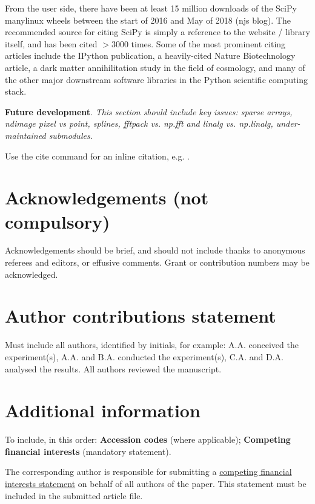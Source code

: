 \documentclass[fleqn,10pt]{wlscirep}
\begin{document}
From the user side, there have been at least 15 million downloads
of the SciPy manylinux wheels between the start of 2016 and May of 2018
(njs blog). The recommended source for citing SciPy is simply a reference
to the website / library itself\cite{SciPylib}, and has been cited $>3000$
times. Some of the most prominent citing articles include the IPython
publication\cite{PER-GRA:2007}, a heavily-cited Nature Biotechnology
article\cite{pmid17287757}, a dark
matter annihilitation study in the field of
cosmology\cite{1475-7516-2012-08-007}, and many of the
other major downstream software libraries in the Python scientific
computing stack.

\textbf{Future development}.
\textit{This section should include key issues: sparse arrays, ndimage pixel vs point, splines, fftpack vs. np.fft and linalg vs. np.linalg, under-maintained submodules.}




\noindent Use the cite command for an inline citation, e.g. \cite{behnel2011cython}.

\section*{Acknowledgements (not compulsory)}

Acknowledgements should be brief, and should not include thanks to anonymous referees and editors, or effusive comments. Grant or contribution numbers may be acknowledged.

\section*{Author contributions statement}

Must include all authors, identified by initials, for example:
A.A. conceived the experiment(s),  A.A. and B.A. conducted the experiment(s), C.A. and D.A. analysed the results.  All authors reviewed the manuscript.

\section*{Additional information}

To include, in this order: \textbf{Accession codes} (where applicable); \textbf{Competing financial interests} (mandatory statement).

The corresponding author is responsible for submitting a \href{http://www.nature.com/srep/policies/index.html#competing}{competing financial interests statement} on behalf of all authors of the paper. This statement must be included in the submitted article file.
\end{document}

